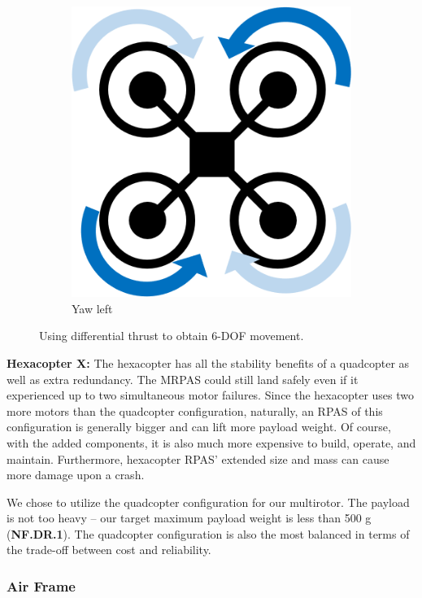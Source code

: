 \begin{figure}[h]
\begin{subfigure}[b]{0.3\textwidth}
    \end{subfigure}
    ~
    \begin{subfigure}[b]{0.3\textwidth}
        \centering
        \includegraphics[scale=0.4]{img/drone_x_yaw}
        \caption{Yaw left}
        \label{fig:x-yaw}
    \end{subfigure}
    
    \caption{Using differential thrust to obtain 6-DOF movement. }
    \label{fig:rpas_6dof}
\end{figure}

\textbf{Hexacopter X:}
The hexacopter has all the stability benefits of a quadcopter as well as extra redundancy. The MRPAS could still land safely even if it experienced up to two simultaneous motor failures. Since the hexacopter uses two more motors than the quadcopter configuration, naturally, an RPAS of this configuration is generally bigger and can lift more payload weight. Of course, with the added components, it is also much more expensive to build, operate, and maintain. Furthermore, hexacopter RPAS' extended size and mass can cause more damage upon a crash.

We chose to utilize the quadcopter configuration for our multirotor. 
The payload is not too heavy -- our target maximum payload weight is less than 500 g (\textbf{NF.DR.1}). The quadcopter configuration is also the most balanced in terms of the trade-off between cost and reliability. 

\subsubsection{Air Frame}\label{section:air-frame}

